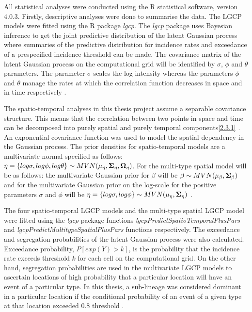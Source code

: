 All statistical analyses were conducted using the R statistical software, version 4.0.3. Firstly, descriptive analyses were done to summarise the data. The LGCP models were fitted using the R package \textit{lgcp}\citep{Taylor:2013, Taylor:2015}. The \textit{lgcp} package uses Bayesian inference to get the joint predictive distribution of the latent Gaussian process where summaries of the predictive distribution for incidence rates and exceedance of a prespecified incidence threshold can be made. The covariance matrix of the latent Gaussian process on the computational grid will be identified by $\sigma$, $\phi$ and $\theta$ parameters. The parameter $\sigma$ scales the log-intensity whereas the parameters $\phi$ and $\theta$ manage the rates at which the correlation function decreases in space and in time respectively \citep{Taylor:2013, Taylor:2015}.

The spatio-temporal analyses in this thesis project assume a separable covariance structure. This means that the correlation between two points in space and time can be decomposed into purely spatial and purely temporal components\ref{2.3.1} \citep{Davies:2013}. An exponential covariance function was used to model the spatial dependency in the Gaussian process. The prior densities for spatio-temporal models are a multivariate normal specified as follows: $\eta = \left\lbrace log \sigma,log \phi, log \theta \right\rbrace  \sim MVN(\bf\mu_{\eta},\bf\Sigma_{\eta}, \bf\Omega_{\eta})$. For the multi-type spatial model will be as follows: the multivariate Gaussian prior for $\beta$ will be $\beta \sim MVN(\bf\mu_{\beta},\bf\Sigma_{\beta})$ and for the multivariate Gaussian prior on the log-scale for the positive parameters $\sigma$ and $\phi$ will be $\eta = \left\lbrace log \sigma,log \phi \right\rbrace  \sim MVN(\bf\mu_{\eta},\bf\Sigma_{\eta})$ \citep{Taylor:2013}.

The four spatio-temporal LGCP models and the multi-type spatial LGCP model were fitted using the \textit{lgcp} package functions \textit{lgcpPredictSpatioTemporalPlusPars} and \textit{lgcpPredictMultitypeSpatialPlusPars} functions respectively. The exceedance and segregation probabilities of the latent Gaussian process were also calculated. Exceedance probability, $P[exp(Y)>k]$, is the probability that the incidence rate exceeds threshold $k$ for each cell on the computational grid. On the other hand, segregation probabilities are used in the multivariate LGCP models to ascertain locations of high probability that a particular location will have an event of a particular type. In this thesis, a sub-lineage was considered dominant in a particular location if the conditional probability of an event of a given type at that location exceeded 0.8 threshold \citep{Taylor:2015}.

